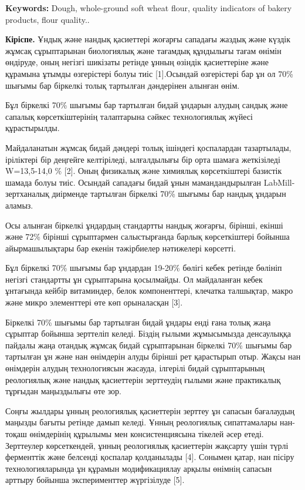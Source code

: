 {\bfseries Keywords:} Dough, whole-ground soft wheat flour, quality
indicators of bakery products, flour quality..

\begin{multicols}{2}
{\bfseries Кіріспе.} Ұндық және нандық қасиеттері жоғарғы сападағы жаздық
және күздік жұмсақ сұрыптарынан биологиялық және тағамдық құндылығы
тағам өнімін өндіруде, оның негізгі шикізаты ретінде ұнның өзіндік
қасиеттеріне және құрамына ұтымды өзгерістері болуы тиіс {[}1{]}.Осындай
өзгерістері бар ұн ол 70\% шығымы бар біркелкі толық тартылған
дәндерінен алынған өнім.

Бұл біркелкі 70\% шығымы бар тартылған бидай ұндарын алудың сандық және
сапалық көрсеткіштерінің талаптарына сәйкес технологиялық жүйесі
құрастырылды.

Майдаланатын жұмсақ бидай дәндері толық ішіндегі қоспалардан
тазартылады, іріліктері бір деңгейге келтіріледі, ылғалдылығы бір орта
шамаға жеткізіледі W=13,5-14,0 \% {[}2{]}. Оның физикалық және химиялық
көрсеткіштері базистік шамада болуы тиіс. Осындай сападағы бидай ұнын
мамандандырылған LabMill- зертханалық диірменде тартылған біркелкі 70\%
шығымы бар нандық ұндарын аламыз.

Осы алынған біркелкі ұндардың стандартты нандық жоғарғы, бірінші, екінші
және 72\% бірінші сұрыптармен салыстырғанда барлық көрсеткіштері бойынша
айырмашылықтары бар екенін тәжірбиелер нәтижелері көрсетті.

Бұл біркелкі 70\% шығымы бар ұндардан 19-20\% бөлігі кебек ретінде
бөлініп негізгі стандартты ұн сұрыптарына қосылмайды. Ол майдаланған
кебек ұнтағында кейбір витаминдер, белок компоненттері, клечатка
талшықтар, макро және микро элементтері өте көп орыналасқан {[}3{]}.

Біркелкі 70\% шығымы бар тартылған бидай ұндары енді ғана толық жаңа
сұрыптар бойынша зерттеліп келеді. Біздің ғылыми жұмысымызда денсаулыққа
пайдалы жаңа отандық жұмсақ бидай сұрыптарынан біркелкі 70\% шығымы бар
тартылған ұн және нан өнімдерін алуды бірінші рет қарастырып отыр. Жақсы
нан өнімдерін алудың технологиясын жасауда, ілгерілі бидай сұрыптарының
реологиялық және нандық қасиеттерін зерттеудің ғылыми және практикалық
тұрғыдан маңыздылығы өте зор.

Соңғы жылдары ұнның реологиялық қасиеттерін зерттеу ұн сапасын
бағалаудың маңызды бағыты ретінде дамып келеді. Ұнның реологиялық
сипаттамалары нан-тоқаш өнімдерінің құрылымы мен консистенциясына
тікелей әсер етеді. Зерттеулер көрсеткендей, ұнның реологиялық
қасиеттерін жақсарту үшін түрлі ферменттік және белсенді қоспалар
қолданылады {[}4{]}. Сонымен қатар, нан пісіру технологияларында ұн
құрамын модификациялау арқылы өнімнің сапасын арттыру бойынша
эксперименттер жүргізілуде {[}5{]}.


\end{multicols}

